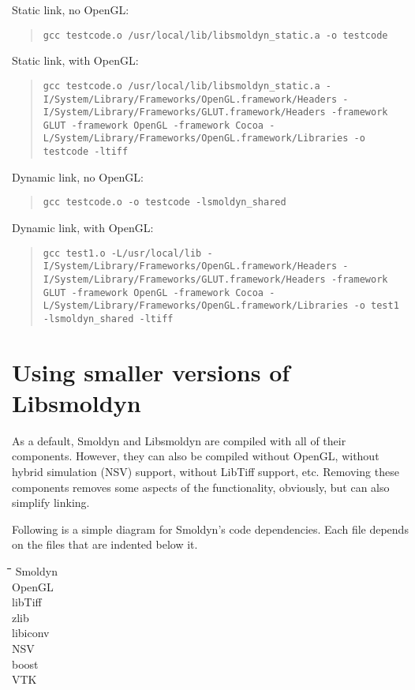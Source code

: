 \documentclass {book}
\begin{document}
Static link, no OpenGL:
\begin{quote}
\lstinline{gcc testcode.o /usr/local/lib/libsmoldyn_static.a -o testcode}
\end{quote}

Static link, with OpenGL:
\begin{quote}
\lstinline{gcc testcode.o /usr/local/lib/libsmoldyn_static.a -I/System/Library/Frameworks/OpenGL.framework/Headers -I/System/Library/Frameworks/GLUT.framework/Headers -framework GLUT -framework OpenGL -framework Cocoa -L/System/Library/Frameworks/OpenGL.framework/Libraries -o testcode -ltiff}
\end{quote}

Dynamic link, no OpenGL:
\begin{quote}
\lstinline{gcc testcode.o -o testcode -lsmoldyn_shared}
\end{quote}

Dynamic link, with OpenGL:
\begin{quote}
\lstinline{gcc test1.o -L/usr/local/lib -I/System/Library/Frameworks/OpenGL.framework/Headers -I/System/Library/Frameworks/GLUT.framework/Headers -framework GLUT -framework OpenGL -framework Cocoa -L/System/Library/Frameworks/OpenGL.framework/Libraries -o test1 -lsmoldyn_shared -ltiff}
\end{quote}


\section{Using smaller versions of Libsmoldyn}

As a default, Smoldyn and Libsmoldyn are compiled with all of their components.  However, they can also be compiled without OpenGL, without hybrid simulation (NSV) support, without LibTiff support, etc.  Removing these components removes some aspects of the functionality, obviously, but can also simplify linking.

Following is a simple diagram for Smoldyn's code dependencies.  Each file depends on the files that are indented below it.

\begin{tabbing}
\hspace{0.25in}\=\hspace{0.25in}\=\hspace{0.25in}\=\hspace{0.25in}\=\hspace{0.25in}\=\kill
\>Smoldyn\\
\>\>OpenGL\\
\>\>libTiff\\
\>\>zlib\\
\>\>libiconv\\
\>\>NSV\\
\>\>\>boost\\
\>\>\>VTK\\
\end{tabbing}
\end{document}
